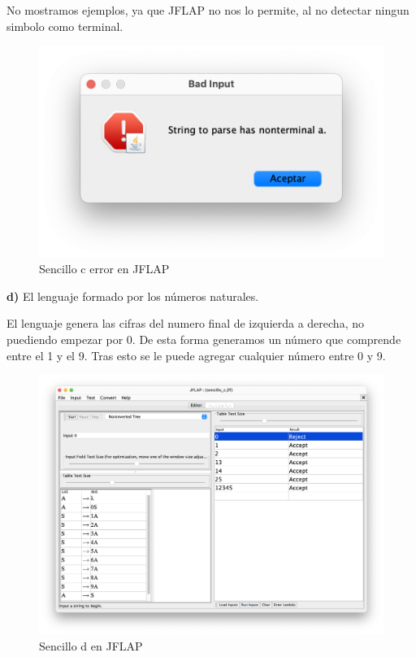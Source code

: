 No mostramos ejemplos, ya que JFLAP no nos lo permite, al no detectar ningun simbolo como terminal.

\begin{figure}[H] 
	\centering
	\includegraphics[scale=0.5]{../practica_1/images/sencillo_c_err.png} 
	\caption{Sencillo c error en JFLAP} 
    \label{fig:sencillo_c_err}
\end{figure}

\textbf{d)}  El lenguaje formado por los números naturales.

El lenguaje genera las cifras del numero final de izquierda a derecha, no puediendo empezar por 0. De esta forma generamos un número que comprende
entre el 1 y el 9. Tras esto se le puede agregar cualquier número entre 0 y 9.

\begin{figure}[H] 
	\centering
	\includegraphics[scale=0.35]{../practica_1/images/sencillo_d.png} 
	\caption{Sencillo d en JFLAP} 
    \label{fig:sencillo_d}
\end{figure}

